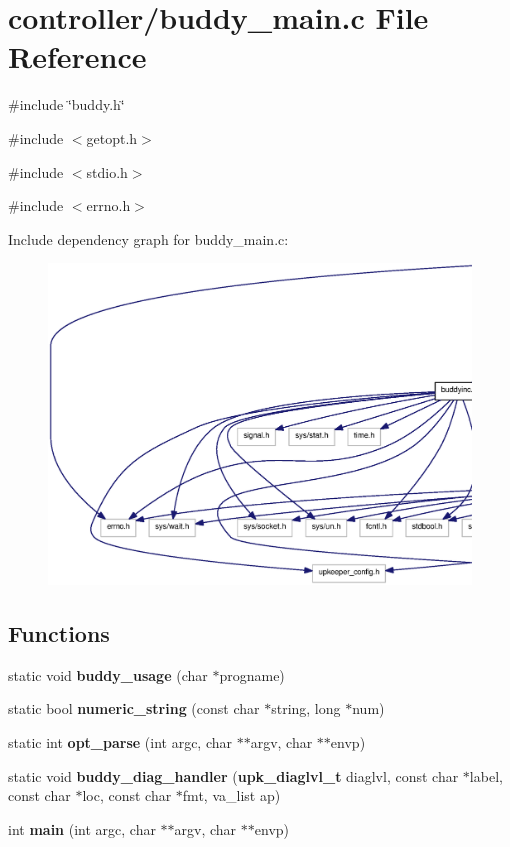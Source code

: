 \section{controller/buddy\_\-main.c File Reference}
\label{buddy__main_8c}
{\ttfamily \#include \char`\"{}buddy.h\char`\"{}}\par
{\ttfamily \#include $<$getopt.h$>$}\par
{\ttfamily \#include $<$stdio.h$>$}\par
{\ttfamily \#include $<$errno.h$>$}\par
Include dependency graph for buddy\_\-main.c:
\nopagebreak
\begin{figure}[H]
\begin{center}
\leavevmode
\includegraphics[width=400pt]{buddy__main_8c__incl}
\end{center}
\end{figure}
\subsection*{Functions}
\begin{DoxyCompactItemize}
\item 
static void {\bf buddy\_\-usage} (char $\ast$progname)
\item 
static bool {\bf numeric\_\-string} (const char $\ast$string, long $\ast$num)
\item 
static int {\bf opt\_\-parse} (int argc, char $\ast$$\ast$argv, char $\ast$$\ast$envp)
\item 
static void {\bf buddy\_\-diag\_\-handler} ({\bf upk\_\-diaglvl\_\-t} diaglvl, const char $\ast$label, const char $\ast$loc, const char $\ast$fmt, va\_\-list ap)
\item 
int {\bf main} (int argc, char $\ast$$\ast$argv, char $\ast$$\ast$envp)
\end{DoxyCompactItemize}


